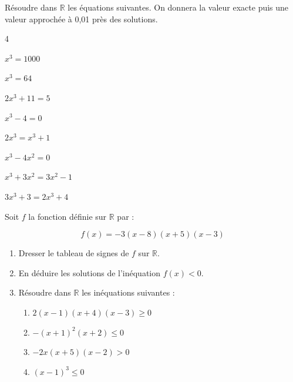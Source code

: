 \documentclass[french]{book}
\begin{document}
\begin{exocor}
Résoudre dans $\mathbb{R}$ les équations suivantes. On donnera la valeur exacte puis une valeur approchée à 0,01 près des solutions.

\begin{enumerate}
\begin{multicols}{4}
\item $x^{3}=1000$
\item $x^{3}=64$
\item $2 x^{3}+11=5$
\item $x^{3}-4=0$
\item $2 x^{3}=x^{3}+1$
\item $x^{3}-4 x^{2}=0$
\item $x^{3}+3 x^{2}=3 x^{2}-1$ 
\item $3 x^{3}+3=2 x^{3}+4$
\end{multicols}
\end{enumerate}
\end{exocor}

\begin{exocor}
Soit $f$ la fonction définie sur $\mathbb{R}$ par :

$$f(x)=-3(x-8)(x+5)(x-3)$$

\begin{enumerate}
	\item Dresser le tableau de signes de $f$ sur $\mathbb{R}$.
	\item En déduire les solutions de l'inéquation $f(x)<0$.	
	\item Résoudre dans $\mathbb{R}$ les inéquations suivantes :
		\begin{enumerate}
			\item $2(x-1)(x+4)(x-3) \geqslant 0$
			\item $-(x+1)^{2}(x+2) \leqslant 0$
			\item $-2 x(x+5)(x-2)>0$  
			\item $(x-1)^{3} \leqslant 0$
		\end{enumerate}
\end{enumerate}
\end{exocor}
\end{document}
